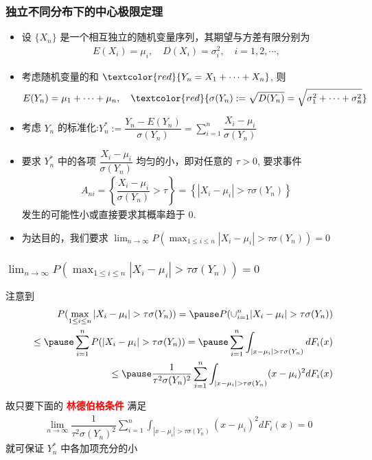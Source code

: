 \begin{frame}
	\frametitle{独立不同分布下的中心极限定理}
	\begin{itemize}[<+-|alert@+>]
		\item 设 $\{X_n\}$ 是一个相互独立的随机变量序列，其期望与方差有限分别为
		\begin{eqnarray*}
			E(X_i)=\mu_i, \quad D(X_i)=\sigma_i^2, \quad i=1,2,\cdots,
		\end{eqnarray*}
		\item 考虑随机变量的和 $\textcolor{red}{Y_n=X_1+\cdots+X_n}$, 则
		\begin{eqnarray*}
			E(Y_n)=\mu_1+\cdots+\mu_n,\quad \textcolor{red}{\sigma(Y_n):=\sqrt{D(Y_n)}=\sqrt{\sigma_1^2+\cdots+\sigma_n^2}}
		\end{eqnarray*}
		\item 考虑 $Y_n$ 的标准化:$ Y_n^*:=\dfrac{Y_n-E (Y_n)}{\sigma (Y_n)}=\sum_{i=1}^n\dfrac{X_i-\mu_i}{\sigma (Y_n)}$
		\item 要求 $Y_n^*$ 中的各项 $\dfrac{X_i-\mu_i}{\sigma (Y_n)}$ 均匀的小，即对任意的 $\tau>0$, 要求事件
		\begin{eqnarray*}
			A_{ni}=\left\{\dfrac{X_i-\mu_i}{\sigma(Y_n)}>\tau\right\}=\left\{|X_i-\mu_i|>\tau\sigma(Y_n)\right\}
		\end{eqnarray*}
		发生的可能性小或直接要求其概率趋于 0.
		\item 为达目的，我们要求 $\lim_{n\rightarrow\infty} P (\max_{1\le i\le n}|X_i-\mu_i|>\tau\sigma (Y_n))=0$
	\end{itemize}
\end{frame}
\begin{frame}
	\frametitle{$\lim_{n\rightarrow\infty}P(\max_{1\le i\le n}|X_i-\mu_i|>\tau\sigma(Y_n))=0$}
	注意到
	\begin{eqnarray*}
		&&P(\max_{1\le i\le n}|X_i-\mu_i|>\tau\sigma(Y_n))=\pause P(\cup_{i=1}^n|X_i-\mu_i|>\tau\sigma(Y_n))\\
		&&\le\pause \sum_{i=1}^nP(|X_i-\mu_i|>\tau\sigma(Y_n))=\pause \sum_{i=1}^n\int_{|x-\mu_i|>\tau\sigma(Y_n)}dF_i(x)\\
		&&\le \pause \dfrac{1}{\tau^2\sigma(Y_n)^2}\sum_{i=1}^n\int_{|x-\mu_i|>\tau\sigma(Y_n)}(x-\mu_i)^2dF_i(x)
	\end{eqnarray*}

	\pause 故只要下面的 \textcolor{red}{\bf 林德伯格条件} 满足
	\begin{eqnarray*}%
		\lim_{n\rightarrow\infty} \dfrac{1}{\tau^2\sigma(Y_n)^2}\sum_{i=1}^n\int_{|x-\mu_i|>\tau\sigma(Y_n)}(x-\mu_i)^2dF_i(x)=0
	\end{eqnarray*}
	就可保证 $Y_n^*$ 中各加项充分的小


\end{frame}

